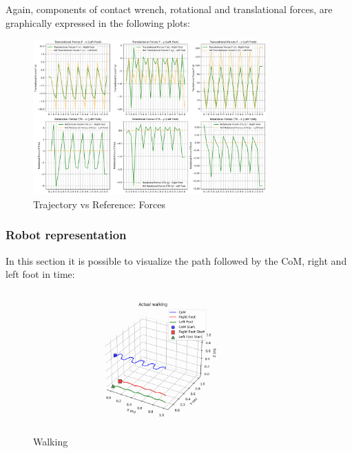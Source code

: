 \documentclass[main.tex]{subfiles}
\begin{document}
Again, components of contact wrench, rotational and translational forces, are graphically expressed in the following plots:
\begin{figure}[htbp]
    \centering
    \includegraphics[width=0.8\textwidth]{figures/contact_forces_walking.png}
    \caption{Trajectory vs Reference: Forces}
    \label{fig:contact_forces_walking}
\end{figure}

\newpage
\subsubsection*{Robot representation}
In this section it is possible to visualize the path followed by the CoM, right and left foot in time:
\begin{figure}[htbp]
    \centering
    \includegraphics[width=0.8\textwidth]{figures/walking.PNG}
    \caption{Walking}
    \label{fig:walking}
\end{figure}
\end{document}
